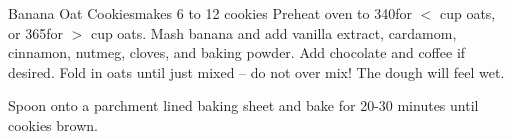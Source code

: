 \begin{recipe}{Banana Oat Cookies}{}{makes 6 to 12 cookies}
Preheat oven to 340\degrees for $<$  cup oats, or 365\degrees for $>$
 cup oats. Mash banana and add vanilla extract, cardamom, cinnamon,
nutmeg, cloves, and baking powder.
Add chocolate and coffee if desired.
Fold in oats until just mixed -- do not over mix! The dough will feel
wet.\newstep

Spoon onto a parchment lined baking sheet and bake for 20-30 minutes until
cookies brown.

\end{recipe}
